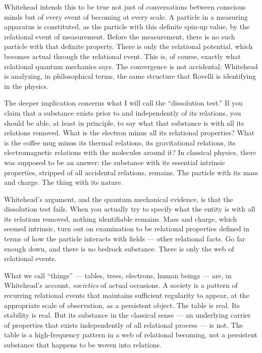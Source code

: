Whitehead intends this to be true not just of conversations between conscious minds but of every event of becoming at every scale. A particle in a measuring apparatus is constituted, as the particle with this definite spin-up value, by the relational event of measurement. Before the measurement, there is no such particle with that definite property. There is only the relational potential, which becomes actual through the relational event. This is, of course, exactly what relational quantum mechanics says. The convergence is not accidental; Whitehead is analyzing, in philosophical terms, the same structure that Rovelli is identifying in the physics.

The deeper implication concerns what I will call the ``dissolution test.'' If you claim that a substance exists prior to and independently of its relations, you should be able, at least in principle, to say what that substance is with all its relations removed. What is the electron minus all its relational properties? What is the coffee mug minus its thermal relations, its gravitational relations, its electromagnetic relations with the molecules around it? In classical physics, there was supposed to be an answer: the substance with its essential intrinsic properties, stripped of all accidental relations, remains. The particle with its mass and charge. The thing with its nature.

Whitehead's argument, and the quantum mechanical evidence, is that the dissolution test fails. When you actually try to specify what the entity is with all its relations removed, nothing identifiable remains. Mass and charge, which seemed intrinsic, turn out on examination to be relational properties defined in terms of how the particle interacts with fields --- other relational facts. Go far enough down, and there is no bedrock substance. There is only the web of relational events.

What we call ``things'' --- tables, trees, electrons, human beings --- are, in Whitehead's account, \emph{societies} of actual occasions. A society is a pattern of recurring relational events that maintains sufficient regularity to appear, at the appropriate scale of observation, as a persistent object. The table is real. Its stability is real. But its substance in the classical sense --- an underlying carrier of properties that exists independently of all relational process --- is not. The table is a high-frequency pattern in a web of relational becoming, not a persistent substance that happens to be woven into relations.

